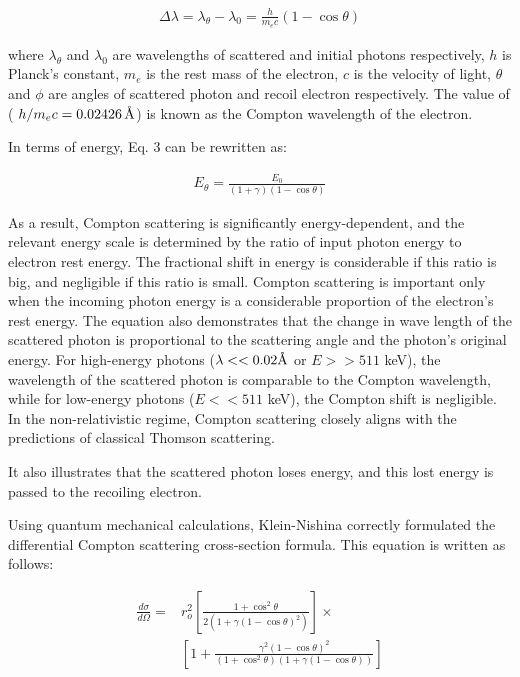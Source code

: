 \begin{align}\Delta\lambda = \lambda_\theta - \lambda_0 = \frac{h}{m_ec}\left(1-\cos\theta\right)\end{align}

where $\lambda_\theta$ and $\lambda_0$ are wavelengths of scattered and initial photons respectively, $h$ is Planck's constant, $m_e$ is the rest mass of the electron, $c$ is the velocity of light, $\theta$ and $\phi$ are angles of scattered photon and recoil electron respectively. The value of ( $h/m_ec = 0.02426\,\textup{\AA}$) is known as the Compton wavelength of the electron. 

In terms of energy, Eq. 3 can be rewritten as:

\begin{align}E_\theta = \frac{E_0}{(1+\gamma)(1-\cos\theta)}\end{align}

As a result, Compton scattering is significantly energy-dependent, and the relevant energy scale is determined by the ratio of input photon energy to electron rest energy. The fractional shift in energy is considerable if this ratio is big, and negligible if this ratio is small. Compton scattering is important only when the incoming photon energy is a considerable proportion of the electron's rest energy. The equation also demonstrates that the change in wave length of the scattered photon is proportional to the scattering angle and the photon's original energy. 
For high-energy photons ($\lambda << 0.02 \textup{\AA}$ or $E >> 511$ keV), the wavelength of the scattered photon is comparable to the Compton wavelength, while for low-energy photons ($E << 511$ keV), the Compton shift is negligible. In the non-relativistic regime, Compton scattering closely aligns with the predictions of classical Thomson scattering.

It also illustrates that the scattered photon loses energy, and this lost energy is passed to the recoiling electron.

Using quantum mechanical calculations, Klein-Nishina correctly formulated the differential Compton scattering cross-section formula. This equation is written as follows:

\begin{equation}
    \begin{split}
        \frac{d\sigma}{d\Omega} = & r_o^2\left[\frac{1+ \cos^2\theta}{2(1+\gamma(1-\cos\theta)^2)}\right] \times \\
        & \left[1+\frac{\gamma^2(1-\cos\theta)^2}{(1+ \cos^2\theta)(1+\gamma(1-\cos\theta))}\right]
    \end{split}
    \label{eq:1}
\end{equation}

